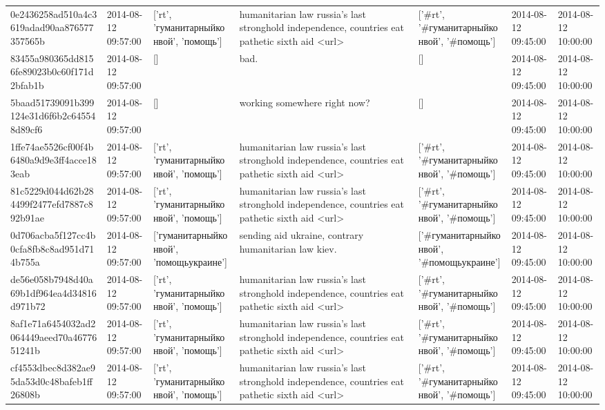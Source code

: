 \begin{tabular}{lllllll}
0e2436258ad510a4c3619adad90aa876577357565b & 2014-08-12 09:57:00 & ['rt', 'гуманитарныйконвой', 'помощь'] & humanitarian law russia's last stronghold independence, countries eat pathetic sixth aid <url> & ['#rt', '#гуманитарныйконвой', '#помощь'] & 2014-08-12 09:45:00 & 2014-08-12 10:00:00 \\
83455a980365dd8156fe89023b0c60f171d2bfab1b & 2014-08-12 09:57:00 & [] & bad. & [] & 2014-08-12 09:45:00 & 2014-08-12 10:00:00 \\
5baad51739091b399124e31d6f6b2c645548d89cf6 & 2014-08-12 09:57:00 & [] & working somewhere right now? & [] & 2014-08-12 09:45:00 & 2014-08-12 10:00:00 \\
1ffe74ae5526cf00f4b6480a9d9e3ff4acce183eab & 2014-08-12 09:57:00 & ['rt', 'гуманитарныйконвой', 'помощь'] & humanitarian law russia's last stronghold independence, countries eat pathetic sixth aid <url> & ['#rt', '#гуманитарныйконвой', '#помощь'] & 2014-08-12 09:45:00 & 2014-08-12 10:00:00 \\
81c5229d044d62b284499f2477efd7887c892b91ae & 2014-08-12 09:57:00 & ['rt', 'гуманитарныйконвой', 'помощь'] & humanitarian law russia's last stronghold independence, countries eat pathetic sixth aid <url> & ['#rt', '#гуманитарныйконвой', '#помощь'] & 2014-08-12 09:45:00 & 2014-08-12 10:00:00 \\
0d706acba5f127cc4b0cfa8fb8c8ad951d714b755a & 2014-08-12 09:57:00 & ['гуманитарныйконвой', 'помощьукраине'] & sending aid ukraine, contrary humanitarian law kiev. & ['#гуманитарныйконвой', '#помощьукраине'] & 2014-08-12 09:45:00 & 2014-08-12 10:00:00 \\
de56e058b7948d40a69b1df964ea4d34816d971b72 & 2014-08-12 09:57:00 & ['rt', 'гуманитарныйконвой', 'помощь'] & humanitarian law russia's last stronghold independence, countries eat pathetic sixth aid <url> & ['#rt', '#гуманитарныйконвой', '#помощь'] & 2014-08-12 09:45:00 & 2014-08-12 10:00:00 \\
8af1e71a6454032ad2064449aeed70a4677651241b & 2014-08-12 09:57:00 & ['rt', 'гуманитарныйконвой', 'помощь'] & humanitarian law russia's last stronghold independence, countries eat pathetic sixth aid <url> & ['#rt', '#гуманитарныйконвой', '#помощь'] & 2014-08-12 09:45:00 & 2014-08-12 10:00:00 \\
cf4553dbec8d382ae95da53d0c48bafeb1ff26808b & 2014-08-12 09:57:00 & ['rt', 'гуманитарныйконвой', 'помощь'] & humanitarian law russia's last stronghold independence, countries eat pathetic sixth aid <url> & ['#rt', '#гуманитарныйконвой', '#помощь'] & 2014-08-12 09:45:00 & 2014-08-12 10:00:00 \\

\end{tabular}
